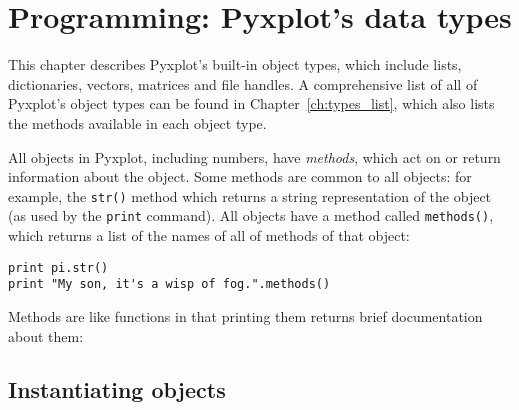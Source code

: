 %
%
%
%
%



\chapter{Programming: Pyxplot's data types}
\label{chap:progDataTypes}

This chapter describes Pyxplot's built-in object types, which include lists,
dictionaries, vectors, matrices and file handles. A comprehensive list of all
of Pyxplot's object types can be found in Chapter~\ref{ch:types_list}, which
also lists the methods available in each object type.

All objects in Pyxplot, including numbers, have {\it methods}, which act on or
return information about the object.  Some methods are common to all objects:
for example, the {\tt str()} method which returns a string representation of
the object (as used by the {\tt print} command). All objects have a method
called {\tt methods()}, which returns a list of the names of all of methods of
that object:

\begin{verbatim}
print pi.str()
print "My son, it's a wisp of fog.".methods()
\end{verbatim}

\noindent Methods are like functions in that printing them returns brief
documentation about them:

\vspace{3mm}

\vspace{3mm}

\section{Instantiating objects}

